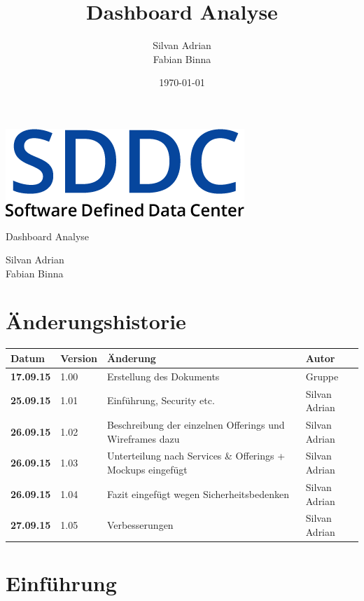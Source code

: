 \documentclass[11pt]{scrartcl}
\title{Dashboard Analyse}
\author{Silvan Adrian \\ Fabian Binna}
\date{\today{}}
\begin{document}
\def\arraystretch{1.5}
\begin{titlepage}
\begin{center}
\vspace{10em}
\includegraphics[scale=2]{SDDC}
\vspace{10em}
\end{center}
\begin{center}
\huge {Dashboard Analyse}
\end{center}
\begin{center}
\vspace{10em}
\LARGE {Silvan Adrian} \\
\LARGE {Fabian Binna}
\end{center}

\end{titlepage}

\newpage
\section{Änderungshistorie}
\begin{tabularx}{\linewidth}{l l X l}
\textbf{Datum} & \textbf{Version} & \textbf{Änderung}  & \textbf{Autor} \\
\hline
\textbf{17.09.15} & 1.00 & Erstellung des Dokuments & Gruppe \\
\textbf{25.09.15} & 1.01 & Einführung, Security etc. & Silvan Adrian \\
\textbf{26.09.15} & 1.02 & Beschreibung der einzelnen Offerings und Wireframes 
dazu & Silvan Adrian\\
\textbf{26.09.15} & 1.03 & Unterteilung nach Services \& Offerings + Mockups 
eingefügt  & Silvan Adrian\\
\textbf{26.09.15} & 1.04 & Fazit eingefügt wegen Sicherheitsbedenken  & Silvan Adrian\\
\textbf{27.09.15} & 1.05 & Verbesserungen & Silvan Adrian\\
\end{tabularx}

\newpage
\tableofcontents
\newpage

\section{Einführung}
\end{document}
